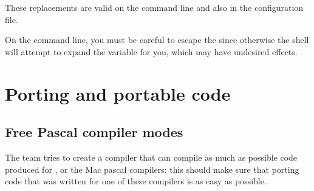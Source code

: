 These replacements are valid on the command line and also in the
configuration file.

On the \linux{} command line, you must be careful to escape the \var{\$} since
otherwise the shell will attempt to expand the variable for you, which may have
undesired effects.





\chapter{Porting and portable code}

\section{Free Pascal compiler modes}
The \fpc team tries to create a compiler that can compile as much as
possible code produced for \tp, \delphi{} or the Mac pascal compilers: this
should make sure that porting code that was written for one of these
compilers is as easy as possible.

